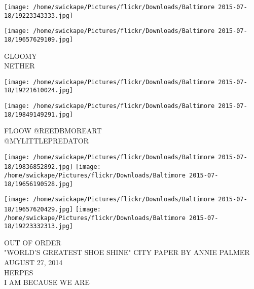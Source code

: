 \documentclass[10pt,letterpaper]{article}
\begin{document}
\texttt{[image: /home/swickape/Pictures/flickr/Downloads/Baltimore 2015-07-18/19223343333.jpg]}

\vspace{0.25in}
\texttt{[image: /home/swickape/Pictures/flickr/Downloads/Baltimore 2015-07-18/19657629109.jpg]}

GLOOMY\\
NETHER\\
\pagebreak

\texttt{[image: /home/swickape/Pictures/flickr/Downloads/Baltimore 2015-07-18/19221610024.jpg]}

\vspace{0.25in}
\texttt{[image: /home/swickape/Pictures/flickr/Downloads/Baltimore 2015-07-18/19849149291.jpg]}

FLOOW @REEDBMOREART\\
@MYLITTLEPREDATOR\\
\pagebreak

\texttt{[image: /home/swickape/Pictures/flickr/Downloads/Baltimore 2015-07-18/19836852892.jpg]}
\texttt{[image: /home/swickape/Pictures/flickr/Downloads/Baltimore 2015-07-18/19656190528.jpg]}

\texttt{[image: /home/swickape/Pictures/flickr/Downloads/Baltimore 2015-07-18/19657620429.jpg]}
\texttt{[image: /home/swickape/Pictures/flickr/Downloads/Baltimore 2015-07-18/19223332313.jpg]}

OUT OF ORDER\\
"WORLD'S GREATEST SHOE SHINE" CITY PAPER BY ANNIE PALMER AUGUST 27, 2014\\
HERPES\\
I AM BECAUSE WE ARE\\
\pagebreak
\end{document}
